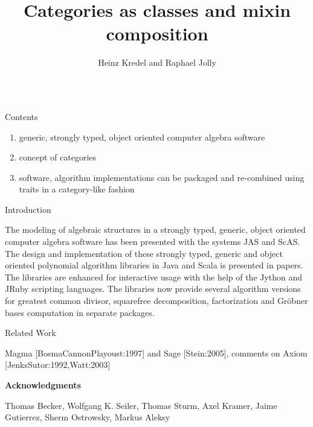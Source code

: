\documentclass[final]{beamer}
\title[Categories and Mixins]{Categories as classes and mixin composition}
\author[Kredel \& Jolly]{Heinz Kredel\inst{1} and Raphael Jolly\inst{2}}
\institute{IT-Center, University of Mannheim, Germany %
\and Databeans, Paris, France%
}
\begin{document}

\begin{frame}{} 
\vfill

\begin{columns}[t]

\begin{column}{.3\linewidth}
 
  \begin{block}{\large Contents}
{\normalsize 
  \begin{enumerate}
  \item generic, strongly typed, object oriented computer algebra software
  \item concept of categories 
  \item software, algorithm implementations can be packaged and
    re-combined using traits in a category-like fashion
  \end{enumerate}
\par}\par
  \end{block}
  \hfill
  \begin{block}{\large Introduction}
{\footnotesize 
The modeling of algebraic structures in a strongly typed, generic,
object oriented computer algebra software has been presented with the
systems JAS and ScAS.
The design and implementation of these strongly typed, generic and
object oriented polynomial algorithm libraries in Java and Scala is
presented in papers.  
The libraries are enhanced for interactive usage with the help of the Jython and
JRuby scripting languages. The libraries now
provide several algorithm versions for greatest common divisor,
squarefree decomposition, factorization and Gr\"obner bases
computation in separate packages.
\par}\par
  \end{block}
  \hfill
  \begin{block}{\large Related Work}
{\normalsize 
Magma [BosmaCannonPlayoust:1997] and Sage [Stein:2005], 
comments on Axiom [JenksSutor:1992,Watt:2003]\par
}\par
{\footnotesize\bf Acknowledgments}\par
{\footnotesize Thomas Becker, Wolfgang K. Seiler, Thomas Sturm, Axel Kramer, 
Jaime Gutierrez, Sherm Ostrowsky, Markus Aleksy\par}

\end{block}
\end{column}
\end{columns}
\end{frame}
\end{document}
